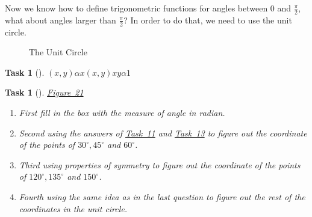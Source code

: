 \documentclass[10pt,]{article}
\theoremstyle{plain}
\newtheorem{proposition}[theorem]{Task}
\theoremstyle{definition}
\numberwithin{equation}{section}
\begin{document}
\hypertarget{p-121}{}%
Now we know how to define trigonometric functions for angles between \(0\) and \(\frac{\pi}{2}\), what about angles larger than \(\frac{\pi}{2}\)? In order to do that, we need to use the unit circle.%
\begin{figure}
\centering
{
}
\caption{The Unit Circle\label{unit-circle}}
\end{figure}
\begin{proposition}[{}]\label{proposition-57}
\((x,y)\)\(\alpha\)\(x\)\((x,y)\)\(x\)\(y\)\(\alpha\)\(1\)\end{proposition}
\begin{proposition}[{}]\label{proposition-58}
\hyperref[unit-circle-fill-in]{Figure~21}\leavevmode%
\begin{enumerate}
\item\hypertarget{li-262}{}First fill in the box with the measure of angle in radian.%
\item\hypertarget{li-263}{}Second using the answers of \hyperref[problem-verifysimpletrigid]{Task~11} and \hyperref[task-30-60]{Task~13} to figure out the coordinate of the points of \(30^{\circ}, 45^{\circ}\) and \(60^{\circ}\).%
\item\hypertarget{li-264}{}Third using properties of symmetry to figure out the coordinate of the points of \(120^{\circ}, 135^{\circ}\) and \(150^{\circ}\).%
\item\hypertarget{li-265}{}Fourth using the same idea as in the last question to figure out the rest of the coordinates in the unit circle.%
\end{enumerate}
\end{proposition}
\end{document}
